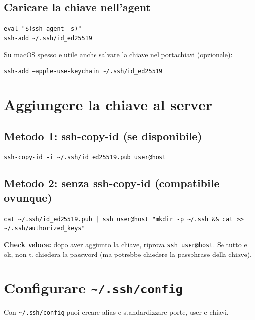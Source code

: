 \documentclass[a4paper,11pt]{article}
\begin{document}
\subsection{Caricare la chiave nell'agent}
\begin{codebox}
\texttt{eval "\$(ssh-agent -s)"} \\
\texttt{ssh-add \textasciitilde/.ssh/id\_ed25519}
\end{codebox}

Su macOS spesso e utile anche salvare la chiave nel portachiavi (opzionale):
\begin{codebox}
\texttt{ssh-add --apple-use-keychain \textasciitilde/.ssh/id\_ed25519}
\end{codebox}

\section{Aggiungere la chiave al server}
\subsection{Metodo 1: ssh-copy-id (se disponibile)}
\begin{codebox}
\texttt{ssh-copy-id -i \textasciitilde/.ssh/id\_ed25519.pub user@host}
\end{codebox}

\subsection{Metodo 2: senza ssh-copy-id (compatibile ovunque)}
\begin{codebox}
\texttt{cat \textasciitilde/.ssh/id\_ed25519.pub | ssh user@host "mkdir -p \textasciitilde/.ssh \&\& cat >> \textasciitilde/.ssh/authorized\_keys"}
\end{codebox}

\begin{tipbox}
\textbf{Check veloce:} dopo aver aggiunto la chiave, riprova \texttt{ssh user@host}. Se tutto e ok, non ti chiedera la password (ma potrebbe chiedere la passphrase della chiave).
\end{tipbox}

\section{Configurare \texttt{\textasciitilde/.ssh/config}}
Con \texttt{\textasciitilde/.ssh/config} puoi creare alias e standardizzare porte, user e chiavi.
\end{document}
